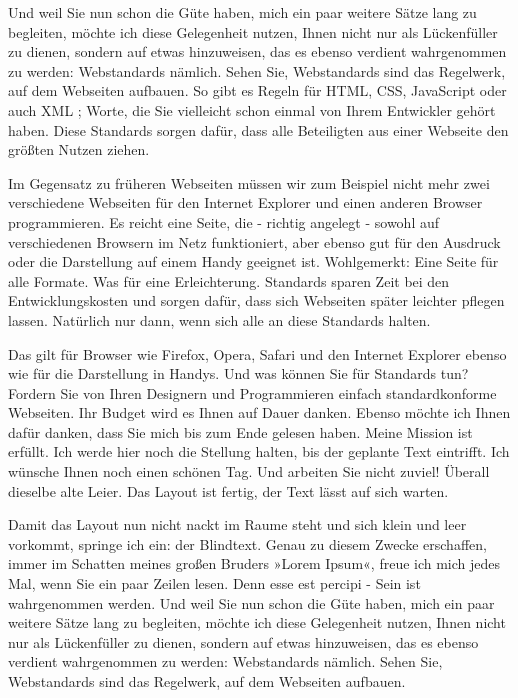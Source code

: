 Und weil Sie nun schon die Güte haben, mich ein paar weitere Sätze lang zu begleiten, möchte ich diese Gelegenheit nutzen, Ihnen nicht nur als Lückenfüller zu dienen, sondern auf etwas hinzuweisen, das es ebenso verdient wahrgenommen zu werden: Webstandards nämlich. Sehen Sie, Webstandards sind das Regelwerk, auf dem Webseiten aufbauen. So gibt es Regeln für HTML, CSS, JavaScript oder auch XML \parencite{Mittelbach.2002}; Worte, die Sie vielleicht schon einmal von Ihrem Entwickler gehört haben. Diese Standards sorgen dafür, dass alle Beteiligten aus einer Webseite den größten Nutzen ziehen.

Im Gegensatz zu früheren Webseiten müssen wir zum Beispiel nicht mehr zwei verschiedene Webseiten für den Internet Explorer und einen anderen Browser programmieren. Es reicht eine Seite, die - richtig angelegt - sowohl auf verschiedenen Browsern im Netz funktioniert, aber ebenso gut für den Ausdruck oder die Darstellung auf einem Handy geeignet ist. Wohlgemerkt: Eine Seite für alle Formate. Was für eine Erleichterung. Standards sparen Zeit bei den Entwicklungskosten und sorgen dafür, dass sich Webseiten später leichter pflegen lassen. Natürlich nur dann, wenn sich alle an diese Standards halten.

Das gilt für Browser wie Firefox, Opera, Safari und den Internet Explorer ebenso wie für die Darstellung in Handys. Und was können Sie für Standards tun? Fordern Sie von Ihren Designern und Programmieren einfach standardkonforme Webseiten. Ihr Budget wird es Ihnen auf Dauer danken. Ebenso möchte ich Ihnen dafür danken, dass Sie mich bis zum Ende gelesen haben. Meine Mission ist erfüllt. Ich werde hier noch die Stellung halten, bis der geplante Text eintrifft. Ich wünsche Ihnen noch einen schönen Tag. Und arbeiten Sie nicht zuviel! Überall dieselbe alte Leier. Das Layout ist fertig, der Text lässt auf sich warten.

Damit das Layout nun nicht nackt im Raume steht und sich klein und leer vorkommt, springe ich ein: der Blindtext. Genau zu diesem Zwecke erschaffen, immer im Schatten meines großen Bruders »Lorem Ipsum«, freue ich mich jedes Mal, wenn Sie ein paar Zeilen lesen. Denn esse est percipi - Sein ist wahrgenommen werden. Und weil Sie nun schon die Güte haben, mich ein paar weitere Sätze lang zu begleiten, möchte ich diese Gelegenheit nutzen, Ihnen nicht nur als Lückenfüller zu dienen, sondern auf etwas hinzuweisen, das es ebenso verdient wahrgenommen zu werden: Webstandards nämlich. Sehen Sie, Webstandards sind das Regelwerk, auf dem Webseiten aufbauen.

